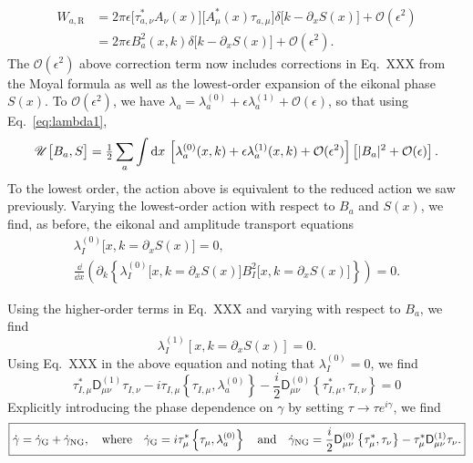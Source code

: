 %
\begin{equation}
  \begin{aligned}
    W_{a,\text{R}} &= 2\pi \epsilon\big[\tau_{a,\nu}^{*} A_{\nu}(x)\big]\big[A^{*}_{\mu}(x)\tau_{a,\mu}\big]\delta\big[k - \partial_{x}S(x)\big] + \mathcal{O}(\epsilon^{2})\\
                   &= 2\pi\epsilon {B^{2}_{a}}(x, k)\delta\big[k - \partial_{x}S(x)\big] + \mathcal{O}(\epsilon^{2}).
  \end{aligned}
\end{equation}
%
The $\mathcal{O}(\epsilon^{2})$ above correction term now includes corrections in Eq.~XXX from the Moyal formula as well as the lowest-order expansion of the eikonal phase $S(x)$.
To $\mathcal{O}(\epsilon^{2})$, we have $\lambda_{a} = \lambda_{a}^{(0)} + \epsilon\lambda_{a}^{(1)} + \mathcal{O}(\epsilon)$, so that using Eq.~\eqref{eq:lambda1},
%
\begin{equation}
  \mathscr{U}\big[B_{a}, S\big] = \tfrac{1}{2} \sum_{a} \int \dd{x}\, \left[\lambda_{a}^{(0)}(x, k) + \epsilon\lambda_{a}^{(1)}(x, k) + \mathcal{O}(\epsilon^{2})\right]\left[\abs{B_{a}}^{2} + \mathcal{O}(\epsilon)\right].
\end{equation}
%
To the lowest order, the action above is equivalent to the reduced action we saw previously.
Varying the lowest-order action with respect to $B_{a}$ and $S(x)$, we find, as before, the eikonal and amplitude transport equations
%
\begin{equation}
  \begin{gathered}
    \lambda_{I}^{(0)}\big[x, k=\partial_{x}S(x)\big] = 0,\\
\frac{\dd}{\dd{x}}\left(\partial_{k}\left\{\lambda_{I}^{(0)}\big[x, k=\partial_{x}S(x)\big]B^{2}_{I}\big[x, k=\partial_{x}S(x)\big]\right\}\right) = 0.
  \end{gathered}
\end{equation}
%

Using the higher-order terms in Eq.~XXX and varying with respect to $B_{a}$, we find
%
\begin{equation}
  \lambda_{I}^{(1)}\left[x, k=\partial_{x}S(x)\right] = 0.
\end{equation}
%
Using Eq.~XXX in the above equation and noting that $\lambda_{I}^{(0)} = 0$, we find
%
\begin{equation}
\tau_{I,\mu}^{*}\mathsf{D}_{\mu\nu}^{(1)}\tau_{I,\nu} - i\tau_{I,\mu}\left\{\tau_{I,\mu}, \lambda^{(0)}_{a}\right\} - \frac{i}{2}\mathsf{D}^{(0)}_{\mu\nu}\left\{\tau_{I,\mu}^{*}, \tau_{I,\nu}\right\} = 0
\end{equation}
%
Explicitly introducing the phase dependence on $\gamma$ by setting $\tau \to \tau e^{i\gamma}$, we find
%
\begin{equation}\boxed{%
  \dot{\gamma} = \dot{\gamma}_{\text{G}} + \dot{\gamma}_{\text{NG}},
  \quad\text{where}\quad
  \dot{\gamma}_{\text{G}} = i\tau_{\mu}^{*}\left\{\tau_{\mu}, \lambda^{(0)}_{a}\right\}
  \quad\text{and}\quad
\dot{\gamma}_{\text{NG}} = \frac{i}{2}\mathsf{D}^{(0)}_{\mu\nu}\left\{\tau_{\mu}^{*}, \tau_{\nu}\right\} - \tau_{\mu}^{*}\mathsf{D}_{\mu\nu}^{(1)}\tau_{\nu}.}
\end{equation}
%


